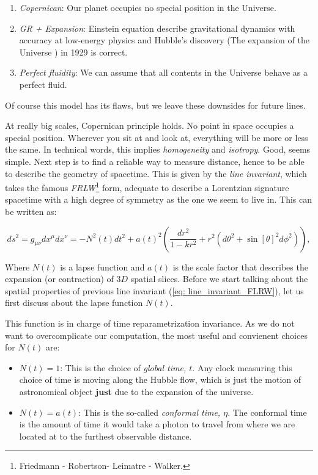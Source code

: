 \documentclass[11pt, a4paper]{article} %
\begin{document}
\begin{enumerate}
	\item \textit{Copernican}: Our planet occupies no special position in the Universe.
	\item \textit{GR + Expansion}: Einstein equation describe gravitational dynamics with accuracy at low-energy physics and Hubble's discovery (The expansion of the Universe \cite{hubble1929relation}) in 1929 is correct.
	\item \textit{Perfect fluidity}: We can assume that all contents in the Universe behave as a perfect fluid.
\end{enumerate}

Of course this model has its flaws, but we leave these downsides for future lines.

At really big scales, Copernican principle holds. No point in space occupies a special position. Wherever you sit at and look at, everything will be more or less the same. In technical words, this implies \textit{homogeneity} and \textit{isotropy}. Good, seems simple. Next step is to find a reliable way to measure distance, hence to be able to describe the geometry of spacetime. This is given by the \textit{line invariant}, which takes the famous \textit{FRLW}\footnote{Friedmann - Robertson- Leimatre - Walker.} form, adequate to describe a Lorentzian signature spacetime with a high degree of symmetry as the one we seem to live in. This can be written as:

\begin{equation}\label{eq: line_invariant_FLRW}
	ds^{2} = g_{\mu \nu} dx^{\mu} dx^{\nu} = - N^{2}(t) dt^{2} + a(t)^2 \left(\frac{dr^{2}}{1- k r^{2}}+ r^{2} \left(d\theta^{2} + \sin[\theta]^{2} d\phi^{2}\right)\right),
\end{equation}

Where $N(t)$ is a lapse function and $a(t)$ is the scale factor that describes the expansion (or contraction) of $3D$ spatial slices. Before we start talking about the spatial properties of previous line invariant (\ref{eq: line_invariant_FLRW}), let us first discuss about the lapse function $N(t)$. 

This function is in charge of time reparametrization invariance. As we do not want to overcomplicate our computation, the most useful and convienent choices for $N(t)$ are:

\begin{itemize}
	\item $N(t) = 1$: This is the choice of \textit{global time, $t$}. Any clock measuring this choice of time is moving along the Hubble flow, which is just the motion of astronomical object \textbf{just} due to the expansion of the universe.
	\item $N(t) = a(t)$: This is the so-called \textit{conformal time, $\eta$}. The conformal time is the amount of time it would take a photon to travel from where we are located at to the furthest observable distance.
\end{itemize}
\end{document}
